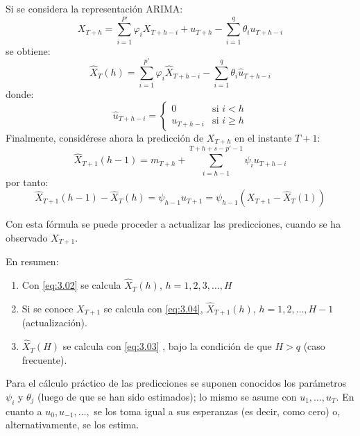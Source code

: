 Si se considera la representaci\'{o}n ARIMA:
\[
X_{T+h} =\sum_{i=1}^{P'} {\varphi_{i} X_{T+h-i} +u_{T+h} -} 
\sum_{i=1}^q {\theta_{i} u_{T+h-i} } 
\]
se obtiene: 
\begin{equation}
\label{eq:3.03}
\widehat{X} _{T} (h)=\sum_{i=1}^{p'} {\varphi_{i} \widehat{X} _{T+h-i} -\sum_{i=1}^q {\theta_{i} \widehat{u} _{T+h-i} } } 
\end{equation}
donde: 
\[
\widehat{u}_{T+h-i} =\begin{cases}
                      0 &  \text{si } i<h \\ 
                      u_{T+h-i}&  \text{si } i\ge h
                     \end{cases}
\]
Finalmente, consid\'{e}rese ahora la predicci\'{o}n de $X_{{T+h}}$ en el instante $T+1$:
\[
\widehat{X}_{T+1} (h-1)=m_{T+h}+\sum_{i=h-1}^{T+h+s-p'-1} {\psi_{i} u_{T+h-i} } 
\]
por tanto:
\begin{equation}
\label{eq:3.04}
\widehat{X} _{T+1} (h-1)-\widehat{X}_{T} (h)=\psi_{h-1} u_{T+1} =\psi_{h-1} (X_{T+1} -\widehat{X}  _{T} (1))
\end{equation}

Con esta f\'{o}rmula se puede proceder a actualizar las predicciones, cuando se ha observado $X_{T+1}$.\newline

En resumen:
\begin{enumerate}
\item Con \eqref{eq:3.02} se calcula $\widehat{X} _{T} (h)$, $h=1,2,3,\ldots,H$
\item Si se conoce $X_{{T+1}}$ se calcula con \eqref{eq:3.04}, $\widehat{X}_{T+1} (h)$, $h=1, 2,\ldots, H-1$ (actualizaci\'{o}n).
\item $\widehat{X} _{T} (H)$ se calcula con \eqref{eq:3.03} , bajo la condici\'{o}n de que $H > q$ (caso frecuente).
\end{enumerate}

\begin{observacion}
Para el c\'{a}lculo pr\'{a}ctico de las predicciones se suponen conocidos los par\'{a}metros $\psi_{i} $ y $\theta _{j} $ (luego de que se han sido estimados); lo mismo se asume con $u_{1} ,\ldots,u_{T} .$ En cuanto a $u_{0} ,u_{-1} ,\ldots,$ se los toma igual a sus esperanzas (es decir, como cero) o, alternativamente, se los estima.
\end{observacion}


